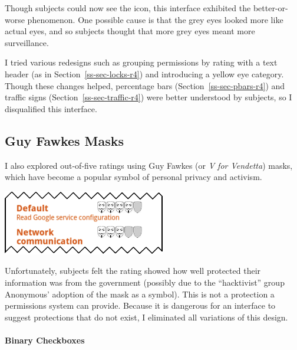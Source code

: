 \documentclass[11pt]{article}
\newcommand{\refsec}[1]{Section~\ref{#1}}
\begin{document}
Though subjects could now see the icon, this interface exhibited 
the better-or-worse phenomenon. One possible cause is that 
the grey eyes looked more like actual eyes, and so subjects thought that more 
grey eyes meant more surveillance. 

I tried various redesigns such as grouping permissions by rating with a
text header (as 
in \refsec{ss-sec-locks-r4}) and introducing a yellow eye category. Though these changes helped, 
percentage bars (\refsec{ss-sec-pbars-r4}) and traffic signs 
(\refsec{ss-sec-traffic-r4}) were better understood by subjects,
so I disqualified this interface.

\subsection{Guy Fawkes Masks}
\label{s-sec-masks}

I also explored out-of-five ratings using 
Guy Fawkes (or \emph{V for Vendetta}) masks, which have become a popular symbol of personal
privacy and activism.
\label{ss-sec-masks-r1}
\begin{center}
\includegraphics[width=.5\linewidth]{candidate-img/masks/masksR1.png}
\end{center}
Unfortunately, subjects felt the
rating showed how well protected their information was from the government 
(possibly due to the ``hacktivist'' group Anonymous' adoption of the mask as a symbol). 
This is not a protection a permissions system can provide. Because it is dangerous for an
interface to suggest protections that do not exist, I eliminated all
variations of this design.

\paragraph{Binary Checkboxes}
\label{s-sec-checkbox}
\end{document}
